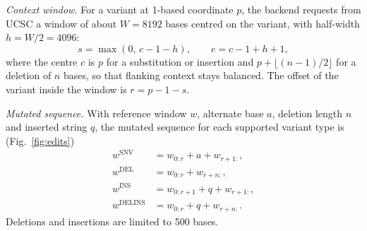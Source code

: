 \documentclass[conference,a4paper]{IEEEtran}
\begin{document}
\textit{Context window.} For a variant at 1-based coordinate $p$, the backend requests from UCSC a window of about $W=8192$ bases centred on the variant, with half-width $h=W/2=4096$:
\begin{equation}
s=\max(0,\,c-1-h), \qquad e=c-1+h+1,
\label{eq:window}
\end{equation}
where the centre $c$ is $p$ for a substitution or insertion and $p+\lfloor(n-1)/2\rfloor$ for a deletion of $n$ bases, so that flanking context stays balanced. The offset of the variant inside the window is $r=p-1-s$.

\textit{Mutated sequence.} With reference window $w$, alternate base $a$, deletion length $n$ and inserted string $q$, the mutated sequence for each supported variant type is (Fig.~\ref{fig:edits})
\begin{align}
w^{\mathrm{SNV}} &= w_{0:r} + a + w_{r+1:}, \label{eq:snv}\\
w^{\mathrm{DEL}} &= w_{0:r} + w_{r+n:}, \label{eq:del}\\
w^{\mathrm{INS}} &= w_{0:r+1} + q + w_{r+1:}, \label{eq:ins}\\
w^{\mathrm{DELINS}} &= w_{0:r} + q + w_{r+n:}. \label{eq:delins}
\end{align}
Deletions and insertions are limited to 500 bases.
\end{document}
